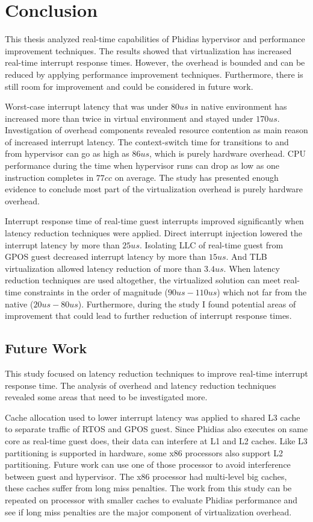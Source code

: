 \chapter{Conclusion\label{chap6}}

This thesis analyzed real-time capabilities of Phidias hypervisor and performance improvement techniques.
The results showed that virtualization has increased real-time interrupt response times.
However, the overhead is bounded and can be reduced by applying performance improvement techniques.
Furthermore, there is still room for improvement and could be considered in future work.

Worst-case interrupt latency that was under $80us$ in native environment has increased more than twice in virtual environment and stayed under $170us$.
Investigation of overhead components revealed resource contention as main reason of increased interrupt latency.
The context-switch time for transitions to and from hypervisor can go as high as $86us$, which is purely hardware overhead.
CPU performance during the time when hypervisor runs can drop as low as one instruction completes in $77cc$ on average.
The study has presented enough evidence to conclude most part of the virtualization overhead is purely hardware overhead.

Interrupt response time of real-time guest interrupts improved significantly when latency reduction techniques were applied.
Direct interrupt injection lowered the interrupt latency by more than $25us$.
Isolating LLC of real-time guest from GPOS guest decreased interrupt latency by more than $15us$.
And TLB virtualization allowed latency reduction of more than $3.4us$.
When latency reduction techniques are used altogether, the virtualized solution can meet real-time constraints in the order of magnitude ($90us-110us$) which not far
from the native ($20us-80us$). 
Furthermore, during the study I found potential areas of improvement that could lead to further reduction of interrupt response times.


\section{Future Work}
This study focused on latency reduction techniques to improve real-time interrupt response time.
The analysis of overhead and latency reduction techniques revealed some areas that need to be investigated more.

Cache allocation used to lower interrupt latency was applied to shared L3 cache to separate traffic of RTOS and GPOS guest.
Since Phidias also executes on same core as real-time guest does, their data can interfere at L1
and L2 caches. Like L3 partitioning is supported in hardware, some x86 processors also support L2 partitioning.
Future work can use one of those processor to avoid interference between guest and hypervisor.
The x86 processor had multi-level big caches, these caches suffer from long miss penalties.
The work from this study can be repeated on processor with smaller caches to 
evaluate Phidias performance and see if long miss penalties are the major component of virtualization overhead.

